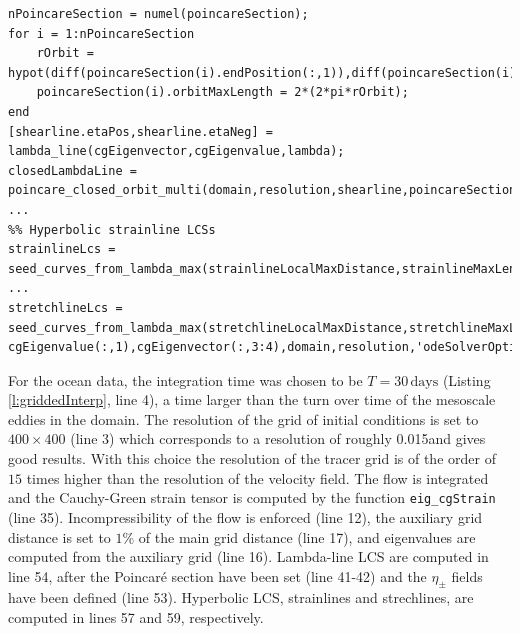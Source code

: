 \documentclass{article}
\begin{document}
\begin{lstlisting}[caption={LCS ocean demo: Parts of the demo script included in LCS Tool to compute LCS from an ocean data set},label=l:griddedInterp]
% Set maximum orbit length to twice the expected circumference
nPoincareSection = numel(poincareSection);
for i = 1:nPoincareSection
    rOrbit = hypot(diff(poincareSection(i).endPosition(:,1)),diff(poincareSection(i).endPosition(:,2)));
    poincareSection(i).orbitMaxLength = 2*(2*pi*rOrbit);
end
[shearline.etaPos,shearline.etaNeg] = lambda_line(cgEigenvector,cgEigenvalue,lambda);
closedLambdaLine = poincare_closed_orbit_multi(domain,resolution,shearline,poincareSection,'odeSolverOptions',lambdaLineOdeSolverOptions);
...
%% Hyperbolic strainline LCSs
strainlineLcs = seed_curves_from_lambda_max(strainlineLocalMaxDistance,strainlineMaxLength,cgEigenvalue(:,2),cgEigenvector(:,1:2),domain,resolution,'odeSolverOptions',strainlineOdeSolverOptions);
...
stretchlineLcs = seed_curves_from_lambda_max(stretchlineLocalMaxDistance,stretchlineMaxLength,-cgEigenvalue(:,1),cgEigenvector(:,3:4),domain,resolution,'odeSolverOptions',stretchlineOdeSolverOptions);

\end{lstlisting}
For the ocean data, the integration time was chosen to be $T=30\,\mathrm{days}$ (Listing \ref{l:griddedInterp}, line 4), a time larger than the turn over time of the mesoscale eddies in the domain. The resolution of the grid of initial conditions is set to $400\times400$ (line 3) which corresponds to a resolution of roughly 0.015\degree and gives good results. With this choice the resolution of the tracer grid is of the order of $15$ times higher than the resolution of the velocity field. The flow is integrated and the Cauchy-Green strain tensor is computed by the function \lstinline!eig_cgStrain! (line 35). Incompressibility of the flow is enforced (line 12), the auxiliary grid distance is set to $1$\% of the main grid distance (line 17), and eigenvalues are computed from the auxiliary grid (line 16). Lambda-line LCS are computed in line 54, after the Poincar\'e section have been set (line 41-42) and the $\eta_\pm$ fields have been defined (line 53). Hyperbolic LCS, strainlines and strechlines, are computed in lines 57 and 59, respectively.
\end{document}
